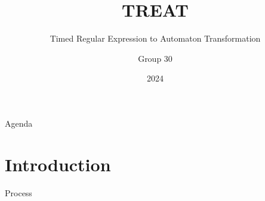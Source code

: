 \documentclass{beamer}
\title{TREAT}
\subtitle{Timed Regular Expression to Automaton Transformation}
\author{Group 30}
\institute{Aalborg Universitet}
\date{2024}
\begin{document}
\frame{\titlepage}

\begin{frame}{Agenda}
    \tableofcontents
\end{frame}

\section{Introduction} %
\begin{frame} {Process}

\end{frame}
\end{document}
